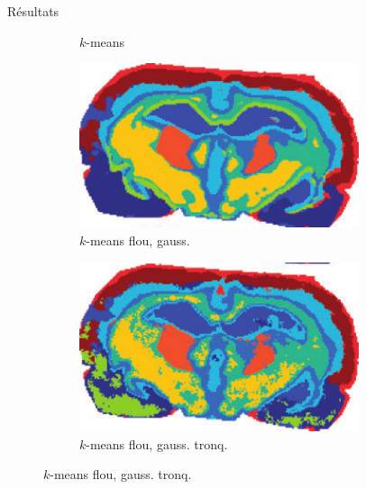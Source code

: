 \documentclass[10pt]{beamer}
\begin{document}
\begin{frame}{Résultats}
\begin{figure}[ht]
\begin{subfigure}[t]{0.33\textwidth}
      \caption{$k$-means}
      \label{subfig:clustering_kmeans}
    \end{subfigure}
    \begin{flushright}
      \begin{subfigure}[t]{0.33\textwidth}
        \centering
        \includegraphics[width=0.9\textwidth]{fig/clustering_sa}
        \caption{$k$-means flou, gauss.}
        \label{subfig:clustering_sa}
      \end{subfigure}%
      \begin{subfigure}[t]{0.33\textwidth}
        \centering
        \includegraphics[width=0.9\textwidth]{fig/clustering_sasa}
        \caption{$k$-means flou, gauss. tronq.}
        \label{subfig:clustering_sasa}
      \end{subfigure}%

    \end{flushright}
  \end{figure}
\end{frame}
\end{document}
